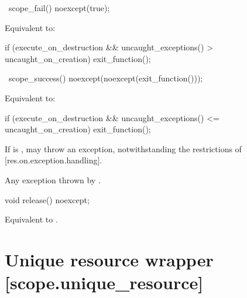 \documentclass[ebook,11pt,article]{memoir}
\begin{document}
\begin{itemdecl}
~scope_fail() noexcept(true);
\end{itemdecl}

\begin{itemdescr}
\pnum
\effects 
Equivalent to:
\begin{codeblock}
if (execute_on_destruction
   && uncaught_exceptions() > uncaught_on_creation)
	exit_function();
\end{codeblock}
\end{itemdescr}

\begin{itemdecl}
~scope_success() noexcept(noexcept(exit_function()));
\end{itemdecl}

\begin{itemdescr}
\pnum
\effects
Equivalent to:
\begin{codeblock}
if (execute_on_destruction 
   && uncaught_exceptions() <= uncaught_on_creation)
	exit_function();   
\end{codeblock}

\pnum
\begin{note}
If  is ,  may throw an exception, notwithstanding the restrictions of [res.on.exception.handling].
\end{note}

\pnum
\throws
Any exception thrown by .

\end{itemdescr}

\begin{itemdecl}
void release() noexcept;
\end{itemdecl}

\begin{itemdescr}
\pnum
\effects
Equivalent to
.
\end{itemdescr}



\section{Unique resource wrapper [scope.unique_resource]}
\end{document}
